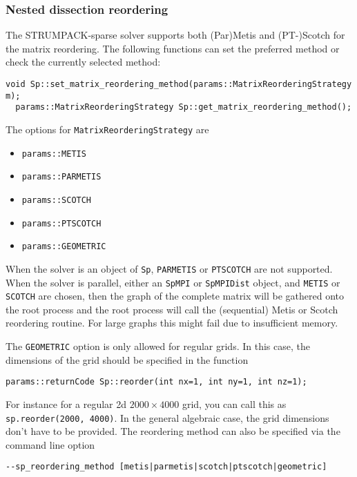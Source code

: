 \documentclass{article}
\begin{document}
\subsubsection{Nested dissection reordering}
The STRUMPACK-sparse solver supports both (Par)Metis and (PT-)Scotch
for the matrix reordering. The following functions can set the
preferred method or check the currently selected method:
\begin{lstlisting}[style=C]
  void Sp::set_matrix_reordering_method(params::MatrixReorderingStrategy m);
  params::MatrixReorderingStrategy Sp::get_matrix_reordering_method();
\end{lstlisting}
The options for
\lstinline[style=C]!MatrixReorderingStrategy! are
{\small \begin{itemize}
\item \lstinline[style=C]!params::METIS!
\item \lstinline[style=C]!params::PARMETIS!
\item \lstinline[style=C]!params::SCOTCH!
\item \lstinline[style=C]!params::PTSCOTCH!
\item \lstinline[style=C]!params::GEOMETRIC!
\end{itemize}} When the solver is an object of
\lstinline[style=C]!Sp!, \lstinline[style=C]!PARMETIS! or
\lstinline[style=C]!PTSCOTCH! are not supported.  When the solver is
parallel, either an \lstinline[style=C]!SpMPI! or
\lstinline[style=C]!SpMPIDist! object, and \lstinline[style=C]!METIS!
or \lstinline[style=C]!SCOTCH! are chosen, then the graph of the
complete matrix will be gathered onto the root process and the root
process will call the (sequential) Metis or Scotch reordering
routine. For large graphs this might fail due to insufficient memory.

The \lstinline[style=C]!GEOMETRIC! option is only allowed for regular
grids. In this case, the dimensions of the grid should be specified in
the function
\begin{lstlisting}[style=C]
  params::returnCode Sp::reorder(int nx=1, int ny=1, int nz=1);
\end{lstlisting}
For instance for a regular 2d $2000 \times 4000$ grid, you can call
this as \lstinline[style=C]!sp.reorder(2000, 4000)!. In the general
algebraic case, the grid dimensions don't have to be provided. The
reordering method can also be specified via the command line option
\begin{lstlisting}[style=Bash]
  --sp_reordering_method [metis|parmetis|scotch|ptscotch|geometric]
\end{lstlisting}
\end{document}
